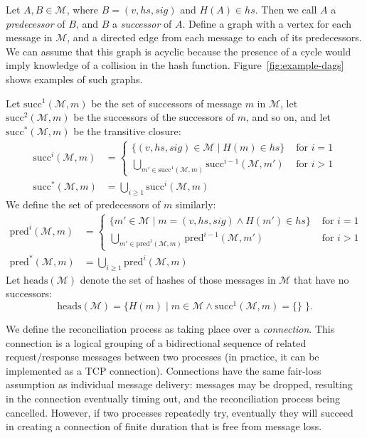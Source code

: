 \documentclass[a4paper,anonymous,USenglish]{lipics-v2019}
\begin{document}
Let $A, B \in \mathcal{M}$, where $B = (v, \mathit{hs}, \mathit{sig})$ and $H(A) \in \mathit{hs}$.
Then we call $A$ a \emph{predecessor} of $B$, and $B$ a \emph{successor} of $A$.
Define a graph with a vertex for each message in $\mathcal{M}$, and a directed edge from each message to each of its predecessors.
We can assume that this graph is acyclic because the presence of a cycle would imply knowledge of a collision in the hash function.
Figure~\ref{fig:example-dags} shows examples of such graphs.

Let $\mathrm{succ}^1(\mathcal{M}, m)$ be the set of successors of message $m$ in $\mathcal{M}$, let $\mathrm{succ}^2(\mathcal{M}, m)$ be the successors of the successors of $m$, and so on, and let $\mathrm{succ}^*(\mathcal{M}, m)$ be the transitive closure:
\begin{align*}
\mathrm{succ}^i(\mathcal{M}, m) &=
\begin{cases}
\{(v, \mathit{hs}, \mathit{sig}) \in \mathcal{M} \mid H(m) \in \mathit{hs}\} & \text{ for } i=1 \\
\bigcup_{m' \in \mathrm{succ}^1(\mathcal{M}, m)} \mathrm{succ}^{i-1}(\mathcal{M}, m') & \text{ for } i>1
\end{cases} \\
\mathrm{succ}^*(\mathcal{M}, m) &= \bigcup_{i \ge 1} \mathrm{succ}^i(\mathcal{M}, m)
\end{align*}
We define the set of predecessors of $m$ similarly:
\begin{align*}
\mathrm{pred}^i(\mathcal{M}, m) &=
\begin{cases}
\{ m' \in \mathcal{M} \mid m = (v, \mathit{hs}, \mathit{sig}) \wedge H(m') \in \mathit{hs}\} & \text{ for } i=1 \\
\bigcup_{m' \in \mathrm{pred}^1(\mathcal{M}, m)} \mathrm{pred}^{i-1}(\mathcal{M}, m') & \text{ for } i>1
\end{cases} \\
\mathrm{pred}^*(\mathcal{M}, m) &= \bigcup_{i \ge 1} \mathrm{pred}^i(\mathcal{M}, m)
\end{align*}
Let $\mathrm{heads}(\mathcal{M})$ denote the set of hashes of those messages in $\mathcal{M}$ that have no successors:
\[ \mathrm{heads}(\mathcal{M}) = \{H(m) \mid m \in \mathcal{M} \wedge \mathrm{succ}^1(\mathcal{M}, m) = \{\}\;\}. \]

We define the reconciliation process as taking place over a \emph{connection}.
This connection is a logical grouping of a bidirectional sequence of related request/response messages between two processes (in practice, it can be implemented as a TCP connection).
Connections have the same fair-loss assumption as individual message delivery: messages may be dropped, resulting in the connection eventually timing out, and the reconciliation process being cancelled.
However, if two processes repeatedly try, eventually they will succeed in creating a connection of finite duration that is free from message loss.
\end{document}
